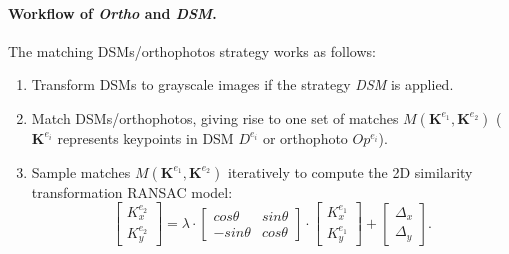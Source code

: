\paragraph{Workflow of \textit{Ortho} and \textit{DSM}.} 
The matching \ac{DSM}s/orthophotos strategy works as follows:\\
\begin{enumerate}
    \item Transform \ac{DSM}s to grayscale images if the strategy \textit{DSM} is applied.
    \item Match \ac{DSM}s/orthophotos, giving rise to one set of matches $M({\mathbf{K}^{e_1},\mathbf{K}^{e_2}})$ ($\mathbf{K}^{e_i}$ represents keypoints in \ac{DSM} $D^{e_i}$ or orthophoto $Op^{e_i}$).
    \item Sample matches $M({\mathbf{K}^{e_1},\mathbf{K}^{e_2}})$ iteratively to compute the 2D similarity transformation RANSAC model:
\begin{equation}
\left [ \begin{array}{c}
{K}_x^{e_2}\\
{K}_y^{e_2}
\end{array}
\right ] =\lambda \cdot { \left[ \begin{array}{cc}
    cos\theta & sin\theta\\
    -sin\theta & cos\theta
    \end{array} 
    \right ]} \cdot {\left [ \begin{array}{c}
    {K}_x^{e_1}\\
    {K}_y^{e_1}
    \end{array}
    \right ]} + \left [ \begin{array}{c}
\Delta_x\\
\Delta_y
\end{array}
\right ]. \label{eq:2DSim}
\end{equation}


\end{enumerate}
